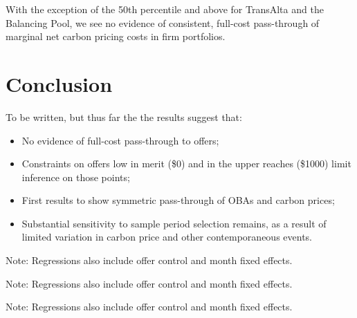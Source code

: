 \documentclass[12pt]{article}
\begin{document}
With the exception of the 50th percentile and above for TransAlta and the Balancing Pool, we see no evidence of consistent, full-cost pass-through of marginal net carbon pricing costs in firm portfolios. 




\section{Conclusion}\label{sec:conclusion}


To be written, but thus far the the results suggest that:
\begin{itemize}
  \item No evidence of full-cost pass-through to offers;
  \item Constraints on offers low in merit (\$0) and in the upper reaches (\$1000) limit inference on those points;
  \item First results to show symmetric pass-through of OBAs and carbon prices;
  \item Substantial sensitivity to sample period selection remains, as a result of limited variation in carbon price and other contemporaneous events.
  \end{itemize}




\appendix
\renewcommand{\thetable}{A\arabic{table}}
\setcounter{table}{0}
\begin{landscape}

\noindent Note: Regressions also include offer control and month fixed effects.
\end{landscape}

\begin{landscape}

\noindent Note: Regressions also include offer control and month fixed effects.
\end{landscape}

\begin{landscape}

\noindent Note: Regressions also include offer control and month fixed effects.
\end{landscape}
\end{document}
